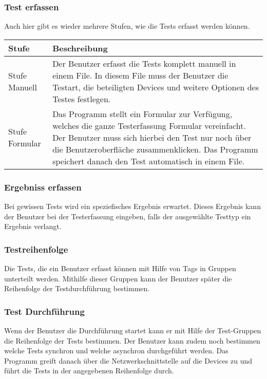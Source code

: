 \documentclass[
	ngerman,
	toc=listof, %
	toc=bibliography, %
	footnotes=multiple, %
	parskip=half, %
	numbers=noendperiod %
]{scrartcl}
\begin{document}
		\subsubsection{Test erfassen}
			Auch hier gibt es wieder mehrere Stufen, wie die Tests erfasst werden können.\\

			\begin{tabularx}{\textwidth}{lX}
				\toprule
				Stufe & Beschreibung\\
				\midrule
				Stufe Manuell & Der Benutzer erfasst die Tests komplett manuell in einem File. In diesem File muss der Benutzer die Testart, die beteiligten Devices und weitere Optionen des Testes festlegen. \\
				\midrule
				Stufe Formular & Das Programm stellt ein Formular zur Verfügung, welches die ganze Testerfassung Formular vereinfacht. Der Benutzer muss sich hierbei den Test nur noch über die Benutzeroberfläche zusammenklicken. Das Programm speichert danach den Test automatisch in einem File. \\
				\bottomrule
			\end{tabularx}

		\subsubsection{Ergebniss erfassen}
			Bei gewissen Tests wird ein speziefisches Ergebnis erwartet. Dieses Ergebnis kann der Benutzer bei der Testerfassung eingeben, falls der ausgewählte Testtyp ein Ergebnis verlangt.

		\subsubsection{Testreihenfolge}
			Die Tests, die ein Benutzer erfasst können mit Hilfe von Tags in Gruppen unterteilt werden. Mithilfe dieser Gruppen kann der Benutzer später die Reihenfolge der Testdurchführung bestimmen.
	

		\subsubsection{Test Durchführung}
			Wenn der Benutzer die Durchführung startet kann er mit Hilfe der Test-Gruppen die Reihenfolge der Tests bestimmen. Der Benutzer kann zudem noch bestimmen welche Tests synchron und welche asynchron durchgeführt werden.
			Das Programm greift danach über die Netzwerkschnittstelle auf die Devices zu und führt die Tests in der angegebenen Reihenfolge durch.
\end{document}
